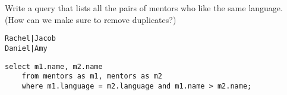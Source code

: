 \begin{blocksection}
\question Write a query that lists all the pairs of mentors who like the same language. (How can we make sure to remove duplicates?)

\begin{lstlisting}
Rachel|Jacob
Daniel|Amy
\end{lstlisting}

\begin{solution}[1in]
\begin{lstlisting}
select m1.name, m2.name
    from mentors as m1, mentors as m2
    where m1.language = m2.language and m1.name > m2.name;
\end{lstlisting}
\end{solution}
\end{blocksection}
